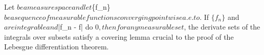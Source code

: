 Let $ be a measure space and let $\{f_n\}$ be a sequence of measurable functions converging pointwise a.e. to $. If $\{f_n\}$ and $ are integrable and $\int |f_n - f| d\mu 	o 0$, then for any measurable set $, the derivate sets of the integrals over subsets satisfy a covering lemma crucial to the proof of the Lebesgue differentiation theorem.

